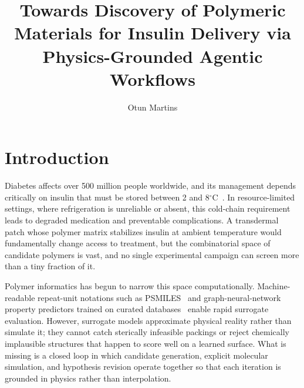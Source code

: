 \documentclass[twocolumn]{fairmeta}
\title{Towards Discovery of Polymeric Materials for Insulin Delivery via Physics-Grounded Agentic Workflows}
\author[1]{Otun Martins}
\affiliation[1]{Algonix Ltd., United Kingdom}
\begin{document}
\maketitle

\section{Introduction}

Diabetes affects over 500 million people worldwide, and its management depends critically on insulin that must be stored between 2 and 8$^{\circ}$C~\cite{hsu2022glycosylated}.
In resource-limited settings, where refrigeration is unreliable or absent, this cold-chain requirement leads to degraded medication and preventable complications.
A transdermal patch whose polymer matrix stabilizes insulin at ambient temperature would fundamentally change access to treatment, but the combinatorial space of candidate polymers is vast, and no single experimental campaign can screen more than a tiny fraction of it.

Polymer informatics has begun to narrow this space computationally.
Machine-readable repeat-unit notations such as PSMILES~\cite{lin2019bigsmiles,kuenneth2023polybert} and graph-neural-network property predictors trained on curated databases~\cite{huan2020polymer,kern2022solvent,gurnani2024ai} enable rapid surrogate evaluation.
However, surrogate models approximate physical reality rather than simulate it; they cannot catch sterically infeasible packings or reject chemically implausible structures that happen to score well on a learned surface.
What is missing is a closed loop in which candidate generation, explicit molecular simulation, and hypothesis revision operate together so that each iteration is grounded in physics rather than interpolation.
\end{document}
